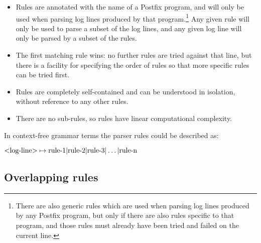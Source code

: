 \documentclass[a4paper,12pt,draft]{article}
\begin{document}
\begin{itemize}

    \item Rules are annotated with the name of a Postfix program, and will
        only be used when parsing log lines produced by that
        program.\footnote{There are also generic rules which are used when
        parsing log lines produced by any Postfix program, but only if
        there are also rules specific to that program, and those rules must
        already have been tried and failed on the current line.}  Any given
        rule will only be used to parse a subset of the log lines, and any
        given log line will only be parsed by a subset of the rules.

    \item The first matching rule wins: no further rules are tried against
        that line, but there is a facility for specifying the order of
        rules so that more specific rules can be tried first.

    \item Rules are completely self-contained and can be understood in
        isolation, without reference to any other rules.

    \item There are no sub-rules, so rules have linear computational
        complexity.

\end{itemize}

\label{comparison against context-free grammars}

In context-free grammar terms the parser rules could be described as:

$\text{\textless{}log-line\textgreater{}} \mapsto \text{rule-1} |
\text{rule-2} | \text{rule-3} | \dots | \text{rule-n}$


\subsection{Overlapping rules}

\label{overlapping rules}
\end{document}
